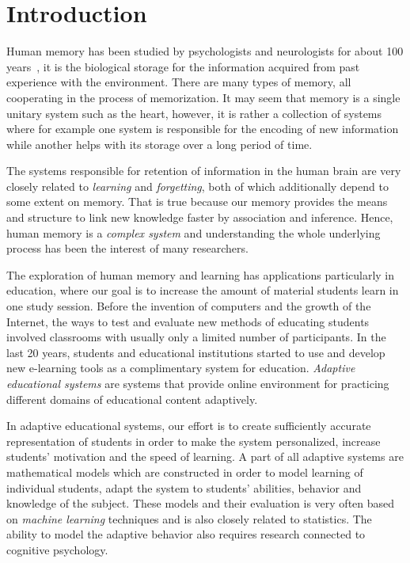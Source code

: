 \chapter{Introduction}

Human memory has been studied by psychologists and neurologists for about 100 years~\cite{baddeley1997human}, it is the biological storage for the information acquired from past experience with the environment. There are many types of memory, all cooperating in the process of memorization. It may seem that memory is a single unitary system such as the heart, however, it is rather a collection of systems where for example one system is responsible for the encoding of new information while another helps with its storage over a long period of time.

The systems responsible for retention of information in the human brain are very closely related to \textit{learning} and \textit{forgetting}, both of which additionally depend to some extent on memory. That is true because our memory provides the means and structure to link new knowledge faster by association and inference. Hence, human memory is a \textit{complex system} and understanding the whole underlying process has been the interest of many researchers.

The exploration of human memory and learning has applications particularly in education, where our goal is to increase the amount of material students learn in one study session. Before the invention of computers and the growth of the Internet, the ways to test and evaluate new methods of educating students involved classrooms with usually only a limited number of participants. In the last 20 years, students and educational institutions started to use and develop new e-learning tools as a complimentary system for education. \textit{Adaptive educational systems} are systems that provide online environment for practicing different domains of educational content adaptively.

In adaptive educational systems, our effort is to create sufficiently accurate representation of students in order to make the system personalized, increase students' motivation and the speed of learning. A part of all adaptive systems are mathematical models which are constructed in order to model learning of individual students, adapt the system to students' abilities, behavior and knowledge of the subject. These models and their evaluation is very often based on \textit{machine learning} techniques and is also closely related to statistics. The ability to model the adaptive behavior also requires research connected to cognitive psychology. 

